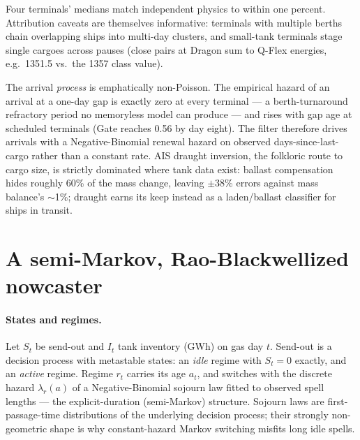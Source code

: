 \documentclass[11pt]{article}
\begin{document}
\noindent Four terminals' medians match independent physics to within one
percent. Attribution caveats are themselves informative: terminals with
multiple berths chain overlapping ships into multi-day clusters, and
small-tank terminals stage single cargoes across pauses (close pairs at
Dragon sum to Q-Flex energies, e.g.\ 1351.5 vs.\ the 1357 class value).

The arrival \emph{process} is emphatically non-Poisson. The empirical
hazard of an arrival at a one-day gap is exactly zero at every terminal
--- a berth-turnaround refractory period no memoryless model can produce
--- and rises with gap age at scheduled terminals (Gate reaches 0.56 by
day eight). The filter therefore drives arrivals with a Negative-Binomial
renewal hazard on observed days-since-last-cargo rather than a constant
rate. AIS draught inversion, the folkloric route to cargo size, is
strictly dominated where tank data exist: ballast compensation hides
roughly 60\% of the mass change, leaving $\pm$38\% errors against mass
balance's $\sim$1\%; draught earns its keep instead as a laden/ballast
classifier for ships in transit.

\section{A semi-Markov, Rao-Blackwellized nowcaster}
\label{sec:model}
\paragraph{States and regimes.} Let $S_t$ be send-out and $I_t$ tank
inventory (GWh) on gas day $t$. Send-out is a decision process with
metastable states: an \emph{idle} regime with $S_t=0$ exactly, and an
\emph{active} regime. Regime $r_t$ carries its age $a_t$, and switches
with the discrete hazard $\lambda_r(a)$ of a Negative-Binomial sojourn law
fitted to observed spell lengths --- the explicit-duration (semi-Markov)
structure. Sojourn laws are first-passage-time distributions of the
underlying decision process; their strongly non-geometric shape is why
constant-hazard Markov switching misfits long idle spells.
\end{document}
